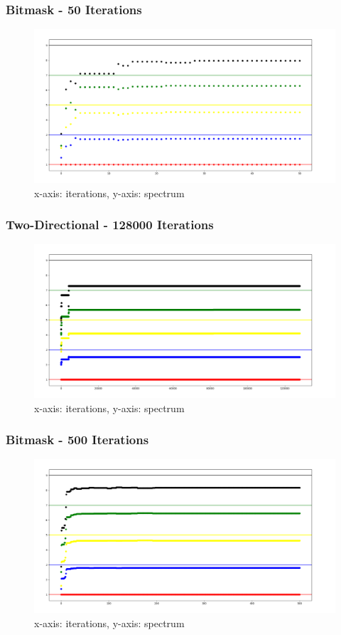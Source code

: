 \documentclass{beamer}
\begin{document}
\begin{frame}
\frametitle{Bitmask - 50 Iterations}
    \begin{figure}
        \centering
        \includegraphics[width=1.1\textwidth,height=2\textheight,keepaspectratio]{Bitmask_50.png}
        \caption{x-axis: iterations, y-axis: spectrum}
    \end{figure}
\end{frame}
\begin{frame}
\frametitle{Two-Directional - 128000 Iterations}
    \begin{figure}
        \centering
        \includegraphics[width=1.1\textwidth,height=2\textheight,keepaspectratio]{Two_128000.png}
        \caption{x-axis: iterations, y-axis: spectrum}
    \end{figure}
\end{frame}
\begin{frame}
\frametitle{Bitmask - 500 Iterations}
    \begin{figure}
        \centering
        \includegraphics[width=1.1\textwidth,height=2\textheight,keepaspectratio]{Bitmask_500.png}
        \caption{x-axis: iterations, y-axis: spectrum}
    \end{figure}
\end{frame}
\end{document}
